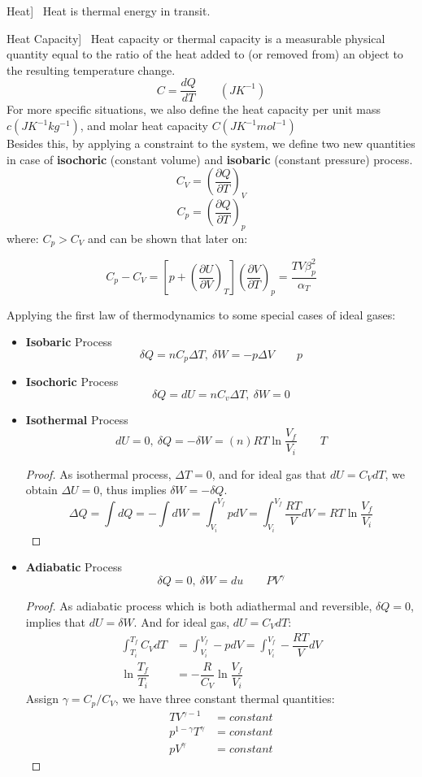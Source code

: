 \documentclass[UTF8]{book}
\newenvironment{theorem}[2][Theorem]{\begin{trivlist}
\item[\hskip \labelsep {\bfseries #1}\hskip \labelsep {\bfseries }]}{\end{trivlist}}
\begin{document}
\begin{theorem}
[Heat]~  {Heat is thermal energy in transit.}
\end{theorem}
\begin{theorem}
[Heat Capacity]~  {Heat capacity or thermal capacity is a measurable physical quantity equal to the ratio of the heat added to (or removed from) an object to the resulting temperature change.}
$$\boxed{C=\dfrac{dQ}{dT} \qquad (JK^{-1})}$$
 {For more specific situations, we also define the heat capacity per unit mass $c(JK^{-1}kg^{-1})$, and molar heat capacity $C(JK^{-1}mol^{-1})$}\\
 {Besides this, by applying a constraint to the system, we define two new quantities in case of \textbf{isochoric} (constant volume) and \textbf{isobaric} (constant pressure) process.}
$$C_V=\left(\dfrac{\partial Q}{\partial T}\right)_V$$
$$C_p=\left(\dfrac{\partial Q}{\partial T}\right)_p$$
 {where: }$C_p > C_V$ { and can be shown that later on:}

\begin{equation}\label{heat capacity}
C_p-C_V=\left[p+\left(\dfrac{\partial U}{\partial V}\right)_T\right]\left(\dfrac{\partial V}{\partial T}\right)_p=\dfrac{TV\beta _p^2}{\alpha _T }
\end{equation}
\end{theorem}
 {Applying the first law of thermodynamics to some special cases of ideal gases:}
\begin{itemize}
\item  {\textbf{Isobaric} Process}
$$\delta Q=nC_p\Delta T,\ \delta W=-p\Delta V \qquad p$$
\item  {\textbf{Isochoric} Process}
$$\delta Q=dU=nC_v\Delta T,\ \delta W=0$$
\item  {\textbf{Isothermal} Process}
$$dU=0,\ \delta Q=-\delta W=(n)RT\ln \dfrac{V_f}{V_i}\qquad T$$
\begin{proof}
 {As isothermal process, $\Delta T=0$, and for ideal gas that $dU=C_VdT$, we obtain $\Delta U=0$, thus implies $\delta W=-\delta Q$.}
$$\Delta Q = \int dQ =-\int dW=\int_{V_i}^{V_f}pdV=\int_{V_i}^{V_f}\dfrac{RT}{V}dV=RT\ln \dfrac{V_f}{V_i}$$
\end{proof}
\item  {\textbf{Adiabatic} Process}
$$\delta Q=0,\  \delta W=du \qquad PV^{\gamma}$$
\begin{proof}
 {As adiabatic process which is both adiathermal and reversible, $\delta Q=0$, implies that $dU=\delta W$. And for ideal gas, $dU=C_VdT$:}
\begin{align*}
\int_{T_i}^{T_f}C_VdT&=\int_{V_i}^{V_f}-pdV=\int_{V_i}^{V_f}-\dfrac{RT}{V}dV\\
\ln \dfrac{T_f}{T_i}&=-\dfrac{R}{C_V}\ln \dfrac{V_f}{V_i}
\end{align*}
 {Assign $\gamma=C_p/C_V$, we have three constant thermal quantities:}
\begin{align*}
TV^{\gamma -1}&= {constant}\\
p^{1-\gamma}T^{\gamma}&= {constant}\\
pV^{\gamma}&= {constant}
\end{align*}
\end{proof}
\end{itemize}
\end{document}
